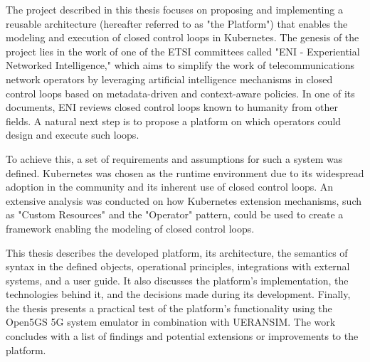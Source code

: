 The project described in this thesis focuses on proposing and implementing a reusable architecture (hereafter referred to as "the Platform") that enables the modeling and execution of closed control loops in Kubernetes. The genesis of the project lies in the work of one of the ETSI committees called "ENI - Experiential Networked Intelligence," which aims to simplify the work of telecommunications network operators by leveraging artificial intelligence mechanisms in closed control loops based on metadata-driven and context-aware policies. In one of its documents, ENI reviews closed control loops known to humanity from other fields. A natural next step is to propose a platform on which operators could design and execute such loops. 

To achieve this, a set of requirements and assumptions for such a system was defined. Kubernetes was chosen as the runtime environment due to its widespread adoption in the community and its inherent use of closed control loops. An extensive analysis was conducted on how Kubernetes extension mechanisms, such as "Custom Resources" and the "Operator" pattern, could be used to create a framework enabling the modeling of closed control loops. 

This thesis describes the developed platform, its architecture, the semantics of syntax in the defined objects, operational principles, integrations with external systems, and a user guide. It also discusses the platform's implementation, the technologies behind it, and the decisions made during its development. Finally, the thesis presents a practical test of the platform's functionality using the Open5GS 5G system emulator in combination with UERANSIM. The work concludes with a list of findings and potential extensions or improvements to the platform.